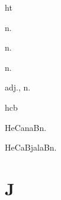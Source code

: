 \begin{multicols*}{2}
\begin{dictroot}{h}{t}
    \begin{dictentry}{}{n.}
    \end{dictentry}
    \begin{dictentry}{}{n.}
    \end{dictentry}
    \begin{dictentry}{}{n.}
    \end{dictentry}
    \begin{dictentry}{}{adj., n.}
    \end{dictentry}
\end{dictroot}

\begin{dictroot}{hc}{b}
    \begin{dictentry}{HeCanaB}{n.}
    \end{dictentry}
    \begin{dictentry}{HeCaBjalaB}{n.}
    \end{dictentry}
\end{dictroot}

\section*{J}


\end{multicols*}
